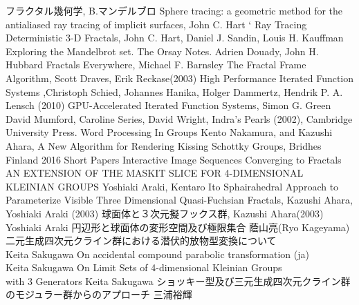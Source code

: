 {
\setlength{\baselineskip}{13pt}
\begin{thebibliography}{99}
        フラクタル幾何学, 
        B.マンデルブロ 
        Sphere tracing: a geometric method for the antialiased ray tracing of implicit surfaces, John C. Hart
`
         Ray Tracing Deterministic 3-D Fractals,
         John C. Hart, Daniel J. Sandin, Louis H. Kauffman
         Exploring the Mandelbrot set. The Orsay Notes.
         Adrien Douady, John H. Hubbard
         Fractals Everywhere, Michael F. Barnsley
        The Fractal Frame Algorithm, Scott Draves, Erik Reckase(2003)
         High Performance Iterated Function Systems
         ,Christoph Schied, Johannes Hanika, Holger Dammertz, Hendrik P. A. Lensch (2010)
         GPU-Accelerated Iterated Function Systems,
         Simon G. Green
         David Mumford, Caroline Series, David Wright, Indra's Pearls
         (2002), Cambridge University Press.
         Word Processing In Groups
         Kento Nakamura, and Kazushi Ahara, A New Algorithm for
         Rendering Kissing Schottky Groups,
         Bridhes Finland 2016 Short Papers
        Interactive Image Sequences Converging to Fractals
        AN EXTENSION OF THE MASKIT SLICE FOR 4-DIMENSIONAL KLEINIAN GROUPS
        Yoshiaki Araki, Kentaro Ito
        Sphairahedral Approach to Parameterize Visible Three Dimensional Quasi-Fuchsian Fractals,
        Kazushi Ahara, Yoshiaki Araki (2003)
        球面体と３次元擬フックス群,
        Kazushi Ahara(2003)
        Yoshiaki Araki
        円辺形と球面体の変形空間及び極限集合
        蔭山亮(Ryo Kageyama)
        二元生成四次元クライン群における潜伏的放物型変換について\\
        Keita Sakugawa
        On accidental compound parabolic transformation (ja)\\
        Keita Sakugawa
        On Limit Sets of 4-dimensional Kleinian Groups\\
with 3 Generators
        Keita Sakugawa
        ショッキー型及び三元生成四次元クライン群のモジュラー群からのアプローチ
        三浦裕輝

\end{thebibliography}}
